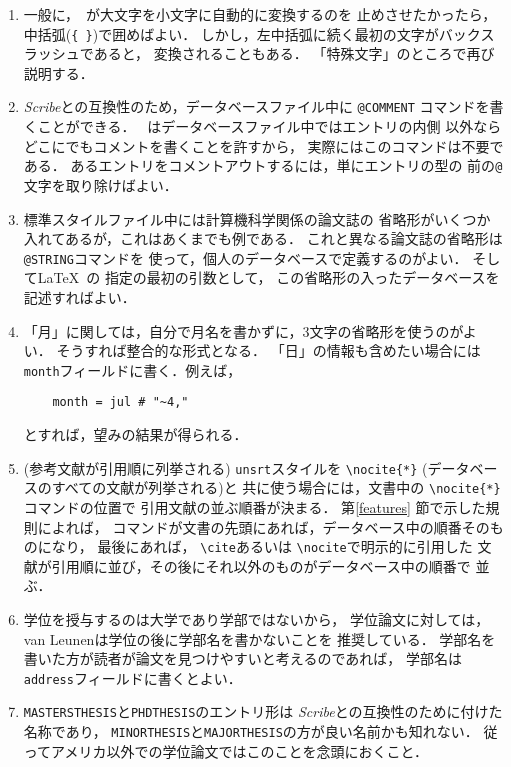 \begin{enumerate}
\item
一般に，\BibTeX\ が大文字を小文字に自動的に変換するのを
止めさせたかったら，中括弧({\tt \{ \}})で囲めばよい．
しかし，左中括弧に続く最初の文字がバックスラッシュであると，
変換されることもある．
「特殊文字」のところで再び説明する．

\item
{\em Scribe\/}との互換性のため，データベースファイル中に {\tt @COMMENT}
コマンドを書くことができる．
\BibTeX\ はデータベースファイル中ではエントリの内側
以外ならどこにでもコメントを書くことを許すから，
実際にはこのコマンドは不要である．
あるエントリをコメントアウトするには，単にエントリの型の
前の{\tt @}文字を取り除けばよい．

\item
標準スタイルファイル中には計算機科学関係の論文誌の
省略形がいくつか入れてあるが，これはあくまでも例である．
これと異なる論文誌の省略形は {\tt @STRING}コマンドを
使って，個人のデータベースで定義するのがよい．
そして\LaTeX\ の \verb||指定の最初の引数として，
この省略形の入ったデータベースを記述すればよい．

\item
「月」に関しては，自分で月名を書かずに，3文字の省略形を使うのがよい．
そうすれば整合的な形式となる．
「日」の情報も含めたい場合には{\tt month}フィールドに書く．例えば，
\begin{verbatim}
    month = jul # "~4,"
\end{verbatim}
とすれば，望みの結果が得られる．

\item
(参考文献が引用順に列挙される) {\tt unsrt}スタイルを \verb|\nocite{*}|
(データベースのすべての文献が列挙される)と
共に使う場合には，文書中の \verb|\nocite{*}|コマンドの位置で
引用文献の並ぶ順番が決まる．
第\ref{features} 節で示した規則によれば，
コマンドが文書の先頭にあれば，データベース中の順番そのものになり，
最後にあれば， \verb|\cite|あるいは \verb|\nocite|で明示的に引用した
文献が引用順に並び，その後にそれ以外のものがデータベース中の順番で
並ぶ．

\item
学位を授与するのは大学であり学部ではないから，
学位論文に対しては，van Leunenは学位の後に学部名を書かないことを
推奨している．
学部名を書いた方が読者が論文を見つけやすいと考えるのであれば，
学部名は{\tt address}フィールドに書くとよい．

\item
{\tt MASTERSTHESIS}と{\tt PHDTHESIS}のエントリ形は
{\em Scribe\/}との互換性のために付けた名称であり，
{\tt MINORTHESIS}と{\tt MAJORTHESIS}の方が良い名前かも知れない．
従ってアメリカ以外での学位論文ではこのことを念頭におくこと．


\end{enumerate}
